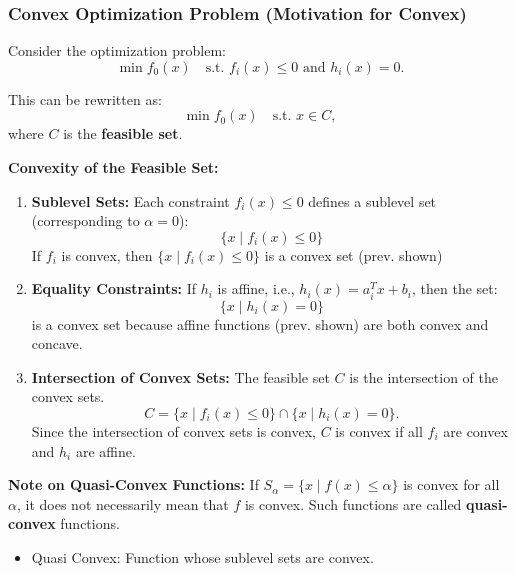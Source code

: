 \subsubsection{Convex Optimization Problem (Motivation for Convex)}
\begin{intuition}
    Consider the optimization problem:
    \[
    \min f_0(x) \quad \text{s.t. } f_i(x) \leq 0 \text{ and } h_i(x) = 0.
    \]

    This can be rewritten as:
    \[
    \min f_0(x) \quad \text{s.t. } x \in C,
    \]
    where $C$ is the \textbf{feasible set}.
    \vspace{1em}

    \textbf{Convexity of the Feasible Set:}
    \begin{enumerate}
        \item \textbf{Sublevel Sets:} Each constraint $f_i(x) \leq 0$ defines a sublevel set (corresponding to $\alpha = 0$):
        \[
        \{x \mid f_i(x) \leq 0\}
        \]
        If $f_i$ is convex, then $\{x \mid f_i(x) \leq 0\}$ is a convex set (prev. shown)

        \item \textbf{Equality Constraints:} If $h_i$ is affine, i.e., $h_i(x) = a_i^T x + b_i$, then the set:
        \[
        \{x \mid h_i(x) = 0\}
        \]
        is a convex set because affine functions (prev. shown) are both convex and concave.

        \item \textbf{Intersection of Convex Sets:} The feasible set $C$ is the intersection of the convex sets.
        \[
        C = \{x \mid f_i(x) \leq 0\} \cap \{x \mid h_i(x) = 0\}.
        \]
        Since the intersection of convex sets is convex, $C$ is convex if all $f_i$ are convex and $h_i$ are affine.

    \end{enumerate}

    \vspace{1em}
    \textbf{Note on Quasi-Convex Functions:} If $S_\alpha = \{x \mid f(x) \leq \alpha\}$ is convex for all $\alpha$, it does not necessarily mean that $f$ is convex. Such functions are called \textbf{quasi-convex} functions.
    \begin{itemize}
        \item Quasi Convex: Function whose sublevel sets are convex. 
    \end{itemize}
\end{intuition}

